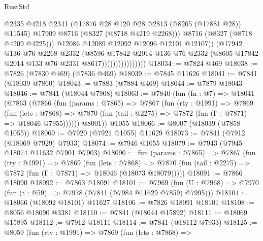 \begin{lexlean}{RustStd}
\begin{coremodule}
{\begin{coremodule}
{{{{{{{{{{{{{{{{{{{{{{{{{{{{{{{{{{{{{{{{{{{{{{{{{{{{{{                                      @2335
                                      @4218
                                      @2341
                                      (@17876 @28 @120 @28 @2813 (@8265 (@17881 @28)) @11545)
                                      @17909
                                      @8716
                                      (@8327 (@8718 @4219 @2268)))
                                    @8716
                                    (@8327 (@8718 @4209 @4225)))
                                  @12086
                                  @12089
                                  @12092
                                  @12096
                                  @12101
                                  @12107))
                              (@17942
                                @136
                                @76
                                @2268
                                @2332
                                (@8596
                                  @17842
                                  @2014
                                  @136
                                  @76
                                  @2332
                                  (@8605 @17842 @2014 @133 @76 @2331 @8617))))))))))))))))
@18034 := @7824 @469
@18038 := @7826 (@7830 @469) (@7836 @469)
@18039 := @7845 @11626
@18041 := @7841 (@18039 @7860)
@18043 := @7883 (@7884 @469)
@18044 := @7879 @18043
@18046 := @7841 (@18044 @7908)
@18063 := @7840
    (fun (fn : @7) =>
    @18041
      (@7863
        (@7866
          (fun (params : @7865) =>
          @7867
            (fun (rty : @1991) =>
            @7869
              (fun (lets : @7868) =>
              @7870 (fun (tail : @2275) => @7872 (fun (Γ : @7871) => @18046 @7955))))))
        @8001))
    @1055
@18066 := @8007 (@18039 (@7858 @1055))
@18069 := @7920 (@7921 @1055) @11629
@18073 := @7841 (@7912 (@18069 @7929) @7933)
@18074 := @7946 @1055
@18079 := @7943 (@7945 @18074 @11632 @7901 @7903)
@18090 := fun (params : @7865) =>
  @7867
    (fun (rty : @1991) =>
    @7869
      (fun (lets : @7868) =>
      @7870 (fun (tail : @2275) => @7872 (fun (Γ : @7871) => @18046 (@18073 @18079)))))
@18091 := @7866 @18090
@18092 := @7863 @18091
@18101 := @7969
    (fun (U : @7968) => @7970 (fun (t : @59) => @7978 (@7841 (@7984 @11629 @7859) @7995)))
@18104 := @18066 (@18092 @18101) @11627
@18106 := @7826 @18091 @18101
@18108 := @8056 @18090 @3381
@18110 := @7841 (@18044 @15892)
@18111 := @18069 @15895
@18112 := @7912 @18111
@18114 := @7841 (@18112 @7933)
@18125 := @8059
    (fun (rty : @1991) =>
    @7869
      (fun (lets : @7868) =>
}}}}}}}}}}}}}}}}}}}}}}}}}}}}}}}}}}}}}}}}}}}}}}}}}}}}}}
\end{coremodule}}
\end{coremodule}
\end{lexlean}

